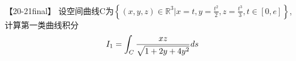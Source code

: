 \documentclass[12pt]{scrartcl}
\begin{document}
{\\
\\
\\
\\
\\
\\
\\
\\
【20-21final】 设空间曲线C为$\left\{ (x,y,z)\in \mathbb{R} ^3|x=t,y=\frac{t^2}{2},z=\frac{t^3}{3},t \in [0,e] \right\} $,
计算第一类曲线积分
\begin{align}
    I_1=\int _C \frac{xz}{\sqrt{1+2y+4y^2}}ds \notag
\end{align}
\\
\\
\\
\\
\\


}
\end{document}
